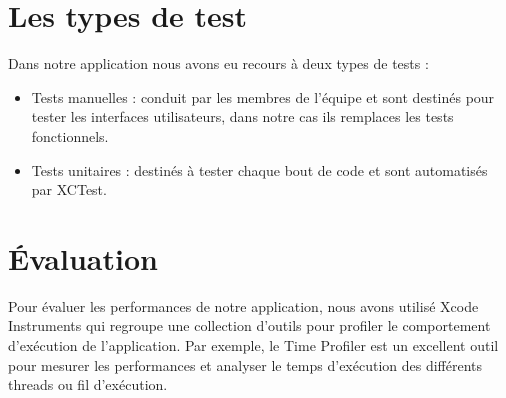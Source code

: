 \section{Les types de test} %
\label{sub:tests}
Dans notre application nous avons eu recours à deux types de tests :
\begin{itemize}
	\item Tests manuelles : conduit par les membres de l'équipe et sont destinés pour tester les interfaces utilisateurs, dans notre cas ils remplaces les tests fonctionnels.
	\item Tests unitaires : destinés à tester chaque bout de code et sont automatisés par XCTest.
\end{itemize}

\section{Évaluation} %
Pour évaluer les performances de notre application, nous avons utilisé Xcode Instruments qui regroupe une collection d'outils pour profiler le comportement d'exécution de l’application. Par exemple, le Time Profiler est un excellent outil pour mesurer les performances et analyser le temps d'exécution des différents threads ou fil d’exécution.
